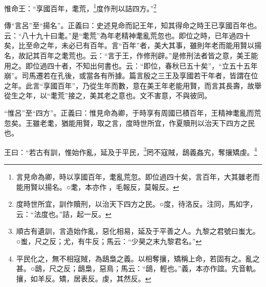 惟命王：“享國百年，耄荒，\footnote{言見命為卿，時以享國百年，耄亂荒忽。即位過四十矣，言百年，大其雖老而能用賢以揚名。○耄，本亦作𦿗，毛報反，莫報反。}度作刑以詰四方。”\footnote{度時世所宜，訓作贖刑，以治天下四方之民。○度，待洛反。注同，馬如字，云：“法度也。”詰，起一反。}


{\noindent\zhuan{}\fzbyks 傳“言呂”至“揚名”。正義曰：史述見命而記王年，知其得命之時王已享國百年也。云：“八十九十曰耄。”是“耄荒”為年老精神耄亂荒忽也。即位之時，已年過四十矣，比至命之年，未必已有百年。言“百年”者，美大其事，雖則年老而能用賢以揚名，故記其百年之耄荒也。云：“言于王，作修刑辟。”是修刑法者皆之意，美王能用之。即位過四十者，不知出何書也。云：“即位，春秋已五十矣”，“立五十五年崩”。司馬遷若在孔後，或當各有所據。篇言殷之三王及享國若干年者，皆謂在位之年。此言“享國百年”，乃從生年而數，意在美王年老能用賢，而言其長壽，故舉從生之年，以“耄荒”接之，美其老之意也。文不害意，不與彼同。 \par}

{\noindent\shu{}\fzkt “惟呂”至“四方”。正義曰：惟見命為卿，于時享有周國已積百年，王精神耄亂而荒忽矣。王雖老耄，猶能用賢，取之言，度時世所宜，作夏贖刑以治天下四方之民也。 \par}

王曰：“若古有訓，惟始作亂，延及于平民，\footnote{順古有遺訓，言造始作亂，惡化相易，延及于平善之人。九黎之君號曰蚩尢。○蚩，尺之反；尤，有牛反；馬云：“少昊之末九黎君名。”}罔不寇賊，鴟義姦宄，奪攘矯虔。\footnote{平民化之，無不相寇賊，為鴟梟之義。以相奪攘，矯稱上命，若固有之。亂之甚。○鴟，尺之反；鴟梟，惡鳥；馬云：“鴟，輕也。”義，本亦作誼。宄音軌。攘，如羊反。矯，居表反。虔，其然反。}


